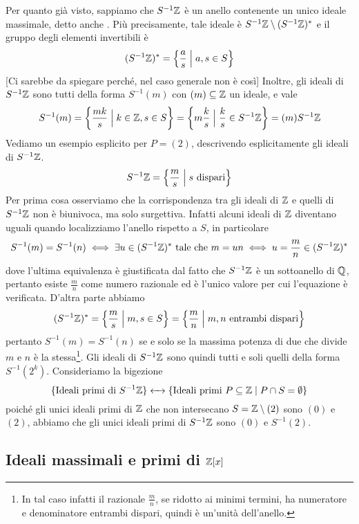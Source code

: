 \documentclass[11pt]{scrartcl}
\begin{document}
Per quanto già visto, sappiamo che $S^{-1}\mathbb Z$ è un anello contenente
un unico ideale massimale, detto anche . Più precisamente,
tale ideale è $S^{-1}\mathbb Z \setminus (S^{-1}\mathbb Z)^*$ e il gruppo degli elementi
invertibili è
\[
    (S^{-1}\mathbb Z)^* = \left\{\frac a s \Bigm| a, s \in S\right\}
\] [Ci sarebbe da spiegare perché, nel caso generale non è così]
Inoltre, gli ideali di $S^{-1}\mathbb Z$
sono tutti della forma $S^{-1}(m)$ con $(m)\subseteq \mathbb Z$ un ideale, e vale 
\[
    S^{-1}(m) = \left\{\frac{mk}{s} \Bigm|k \in \mathbb Z, s \in S\right\} = 
    \left\{m\frac k s\Bigm| \frac k s \in S^{-1}\mathbb Z\right\} = (m)S^{-1}\mathbb Z
\]
Vediamo un esempio esplicito per $P = (2)$, descrivendo esplicitamente gli 
ideali di $S^{-1}\mathbb Z$. 
\[
    S^{-1}\mathbb Z = \left\{\frac m s \Bigm| s \text{ dispari}\right\}
\]
Per prima cosa osserviamo che la corrispondenza tra 
gli ideali di $\mathbb Z$ e quelli di $S^{-1}\mathbb Z$ non è biunivoca, ma solo surgettiva.
Infatti alcuni ideali di $\mathbb Z$ diventano uguali quando localizziamo l'anello
rispetto a $S$, in particolare
\[
    S^{-1}(m) = S^{-1}(n) \iff \exists u \in (S^{-1}\mathbb Z)^* \text{ tale che }
    m = un \iff u = \frac m n \in (S^{-1}\mathbb Z)^*
\]
dove l'ultima equivalenza è giustificata dal fatto che $S^{-1}\mathbb Z$ è un 
sottoanello di $\mathbb Q$, pertanto esiste $\displaystyle\frac m n$ come numero
razionale ed è l'unico valore per cui l'equazione è verificata. D'altra parte
abbiamo 
\[
    (S^{-1}\mathbb Z)^* = \left\{\frac m s \Bigm| m, s \in S\right\} = 
    \left\{\frac m n \Bigm| m, n\text{ entrambi dispari}\right\}
\]
pertanto $S^{-1}(m) = S^{-1}(n)$ se e solo se la massima potenza di due che 
divide $m$ e $n$ è la stessa\footnote{
    In tal caso infatti il razionale $\frac m n$, se ridotto ai 
    minimi termini, ha numeratore e denominatore entrambi dispari, quindi
    è un'unità dell'anello.
}.
Gli ideali di $S^{-1}\mathbb Z$ sono quindi tutti e soli quelli della forma $S^{-1}(2^k)$.
Consideriamo la bigezione
\[
    \{\text{Ideali primi di }S^{-1}\mathbb Z\}\leftarrow\mathrel{\mkern-7mu}\rightarrow 
    \{\text{Ideali primi } P\subseteq \mathbb Z \mid P\cap S = \emptyset\}
\]
poiché gli unici ideali primi di $\mathbb Z$ che non intersecano $S = \mathbb Z\setminus(2)$
sono $(0)$ e $(2)$, abbiamo che gli unici ideali primi di $S^{-1}\mathbb Z$ sono
$(0)$ e $S^{-1}(2)$.

\newpage

\subsection{Ideali massimali e primi di $\mathbb Z[x]$}
\end{document}
